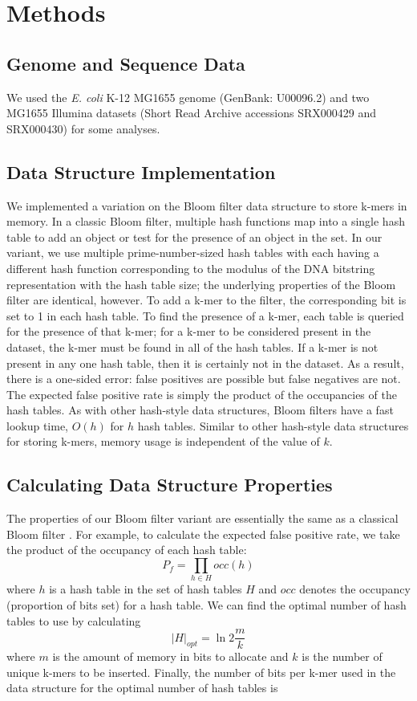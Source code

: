 \documentclass[12pt]{article} \usepackage{simplemargins}
\begin{document}
\section{Methods}

\subsection{Genome and Sequence Data}
We used the \emph{E. coli} K-12 MG1655 genome (GenBank: U00096.2) and two MG1655 Illumina 
datasets (Short Read Archive accessions SRX000429 and SRX000430) for some
analyses. 

\subsection{Data Structure Implementation}
We implemented a variation on the Bloom filter data structure to store
k-mers in memory. In a classic Bloom filter, multiple hash functions
map into a single hash table to add an object or test for the presence
of an object in the set. In our variant, we use multiple
prime-number-sized hash tables with each having a different hash
function corresponding to the modulus of the DNA bitstring
representation with the hash table size; the underlying properties of
the Bloom filter are identical, however.  To add a k-mer to the
filter, the corresponding bit is set to 1 in each hash table.  To find
the presence of a k-mer, each table is queried for the presence of
that k-mer; for a k-mer to be considered present in the dataset, the
k-mer must be found in all of the hash tables.  If a k-mer is not
present in any one hash table, then it is certainly not in the
dataset. As a result, there is a one-sided error: false positives are
possible but false negatives are not. The expected false positive rate
is simply the product of the occupancies of the hash tables.  As with
other hash-style data structures, Bloom filters have a fast lookup
time, $O(h)$ for $h$ hash tables.  Similar to other hash-style data
structures for storing k-mers, memory usage is independent of the
value of $k$.

\subsection{Calculating Data Structure Properties}
The properties of our Bloom filter variant are essentially the
same as a classical Bloom filter \cite{bloomsurvey}.
For example, to calculate the expected false positive 
rate, we
take the product of the occupancy of each hash table:
\begin{displaymath}
P_f = \prod_{h \in H} occ(h)
\end{displaymath}
where $h$ is a hash table in the set of hash tables $H$ and $occ$ denotes
the occupancy (proportion of bits set) for a hash table.
We can find the optimal number of hash tables
to use by calculating
\begin{displaymath}
\vert H \vert_{opt} = \ln 2 \frac{m}{k}
\end{displaymath}
where $m$ is the amount of memory in bits to allocate and $k$
is the number of unique k-mers to be inserted. Finally,
the number of bits per
k-mer used in the data structure for the optimal number of hash 
tables is
\end{document}
